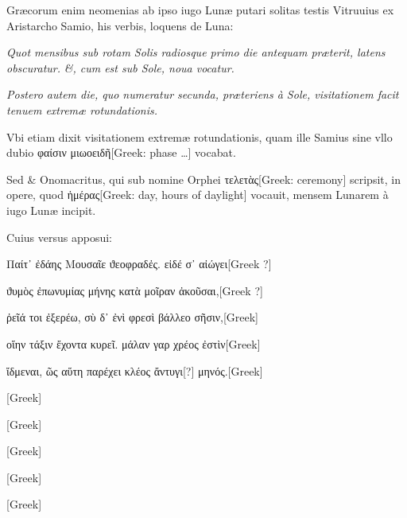 \begin{parnumbers}

Græcorum enim neomenias ab ipso iugo
Lunæ putari solitas testis Vitruuius ex Aristarcho Samio, his verbis,
loquens de Luna:

\textit{Quot mensibus sub rotam Solis radiosque primo die
antequam præterit, latens obscuratur.}
 \textit{\&, cum est sub Sole, noua vocatur.}

\textit{Postero autem die, quo numeratur secunda,
 præteriens à Sole, visitationem
facit tenuem extremæ rotundationis.}

Vbi etiam dixit visitationem
extremæ rotundationis, quam ille Samius sine vllo dubio
 \textgreek{φαίσιν μιωοειδῆ[Greek: phase …]} vocabat.

Sed \& Onomacritus, qui sub nomine Orphei \textgreek{τελετὰς[Greek: ceremony]}
scripsit, in opere, quod
 \textgreek{ἡμέρας[Greek: day, hours of daylight]}
 vocauit, mensem Lunarem à iugo Lunæ
incipit.

Cuius versus apposui:

\begin{greek}
Παίτ᾽ ἐδάης Μουσαῖε ϑεοφραδἐς. εἰδέ σ᾽ αἰώγει[Greek ?]

ϑυμὸς ἐπωνυμίας μήνης κατὰ μοῖραν ἀκοῦσαι,[Greek ?]

ῤεῖά τοι ἐξερέω, σὺ δ᾽ ἐνὶ φρεσὶ βάλλεο σῆσιν,[Greek] 

οἵην τάξιν ἔχοντα κυρεῖ. μάλαν γαρ χρέος ἐστὶν[Greek]

ἴδμεναι, ῶς αὕτη παρέχει κλέος ἄντυγι[?] μηνός.[Greek]

\textgreek{[Greek]}

\textgreek{[Greek]}

\textgreek{[Greek]}

\textgreek{[Greek]}

\textgreek{[Greek]}


\end{greek}
\end{parnumbers}
